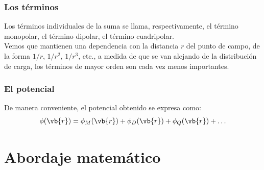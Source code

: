 \begin{frame}
\frametitle{Los términos}
Los términos individuales de la suma se llama, respectivamente, el término monopolar, el término dipolar, el término cuadripolar.
\\
\bigskip
\pause
Vemos que mantienen una dependencia con la distancia $r$ del punto de campo, de la forma $1/r$, $1/r^{2}$, $1/r^{3}$, etc., a medida de que se van alejando de la distribución de carga, los términos de mayor orden son cada vez menos importantes.
\end{frame}
\begin{frame}
\frametitle{El potencial}
De manera conveniente, el potencial obtenido se expresa como:
\begin{align}
\phi(\vb{r}) = \phi_{M}(\vb{r}) + \phi_{D}(\vb{r}) + \phi_{Q}(\vb{r}) + \ldots
\label{eq:ecuacion_08_08}
\end{align}
\end{frame}
\section{Abordaje matemático}
